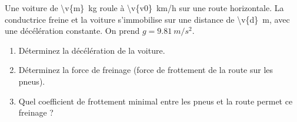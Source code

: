 Une voiture de \qty{\v{m}}{kg} roule à \qty{\v{v0}}{km/h} sur une route horizontale. La conductrice freine et la voiture s'immobilise sur une distance de \qty{\v{d}}{m}, avec une décélération constante. On prend $g = \qty{9.81}{m/s^2}$.

\begin{enumerate}[label=\alph*)]
    \item Déterminez la décélération de la voiture.
    \item Déterminez la force de freinage (force de frottement de la route sur les pneus).
    \item Quel coefficient de frottement minimal entre les pneus et la route permet ce freinage ?
\end{enumerate}
